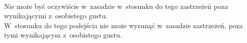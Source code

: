 \documentclass[a4paper,11pt]{article}
\numberwithin{equation}{section}
\begin{document}
\VerSpaceTwo


\noindent
{} \\
\Jest Nie może być oczywiście w~zasadzie w~stosunku do tego zastrzeżeń poza
wynikającymi z~osobistego gustu. \\
\PowinnoByc W~stosunku do tego podejścia nie może wysunąć w~zasadzie
zastrzeżeń, poza tymi wynikającym z~osobistego gustu.












\printbibliography





\end{document}

